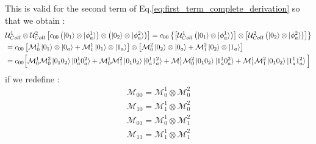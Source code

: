 \documentclass[a4paper,12pt]{article}
\begin{document}
\newpage

This is valid for the second term of Eq.\ref{eq:first_term_complete_derivation} so that we obtain :
\begin{align}
	& \mathcal{U}_{Coll}^{1} \otimes \mathcal{U}_{Coll}^{2} \left[ c_{00} \left(\ket{0_{1}} \otimes \ket{\phi_{a}^{1}} \right) \otimes \left(\ket{0_{2}} \otimes \ket{\phi_{a}^{2}} \right) \right] = c_{00} \left\{ \left[ \mathcal{U}_{Coll}^{1} \left(\ket{0_{1}} \otimes \ket{\phi_{a}^{1}} \right)\right] \otimes \left[ \mathcal{U}_{Coll}^{2} \left(\ket{0_{2}} \otimes \ket{\phi_{a}^{2}} \right) \right] \right\} \notag \\
	& = c_{00} \left[ \mathcal{M}_{0}^{1} \ket{0_{1}} \otimes \ket{0_{a}} + \mathcal{M}_{1}^{1} \ket{0_{1}} \otimes \ket{1_{a}} \right] \otimes \left[ \mathcal{M}_{0}^{2} \ket{0_{2}} \otimes \ket{0_{a}} + \mathcal{M}_{1}^{2} \ket{0_{2}} \otimes \ket{1_{a}} \right] \notag \\
	& = c_{00} \Big[ \mathcal{M}_{0}^{1} \mathcal{M}_{0}^{2} \ket{0_{1}0_{2}} \ket{0_{a}^{1}0_{a}^{2}} + \mathcal{M}_{0}^{1} \mathcal{M}_{1}^{2} \ket{0_{1}0_{2}} \ket{0_{a}^{1}1_{a}^{2}} + \mathcal{M}_{1}^{1} \mathcal{M}_{0}^{2} \ket{0_{1}0_{2}} \ket{1_{a}^{1}0_{a}^{2}} + \mathcal{M}_{1}^{1} \mathcal{M}_{1}^{2} \ket{0_{1}0_{2}} \ket{1_{a}^{1}1_{a}^{2}} \Big] \notag
\end{align}
if we redefine :
\begin{gather*}
	\mathcal{M}_{00} = \mathcal{M}_{0}^{1} \otimes \mathcal{M}_{0}^{2} \\
	\mathcal{M}_{10} = \mathcal{M}_{1}^{1} \otimes \mathcal{M}_{0}^{2} \\
	\mathcal{M}_{01} = \mathcal{M}_{0}^{1} \otimes \mathcal{M}_{1}^{2} \\
	\mathcal{M}_{11} = \mathcal{M}_{1}^{1} \otimes \mathcal{M}_{1}^{2} 
\end{gather*}
\end{document}
